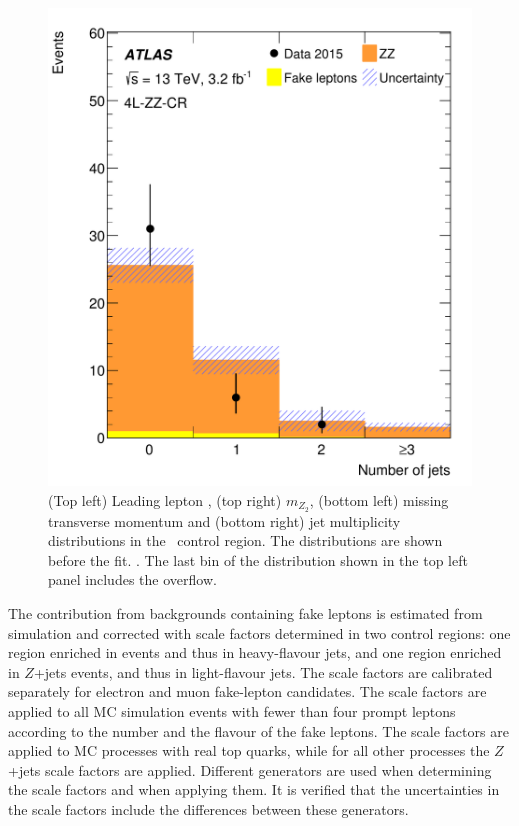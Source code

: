 \begin{figure}[htbp]
\includegraphics[width=\twofigwidth]{CRZZnJets}
\caption{\label{fig:zz_val} (Top left) Leading lepton \pt, (top right)
$m_{Z_2}$, (bottom left) missing transverse momentum and (bottom right) jet
multiplicity distributions in the \FLCR\ control region. The distributions are shown
before the fit. \hatch. The last bin of the distribution shown in the top left
panel includes the overflow.} 
\end{figure}

The contribution from backgrounds containing fake leptons is estimated from
simulation and corrected with scale factors determined in two control regions:
one region enriched in \ttbar events and thus in heavy-flavour jets, and one
region enriched in $Z$+jets events, and thus in light-flavour jets.  The scale factors
are calibrated separately for electron and muon fake-lepton candidates.  The
scale factors are applied to all MC simulation events with fewer than four
prompt leptons according to the number and the flavour of the fake leptons.
The \ttbar scale factors are applied to MC processes with real top quarks,
while for all other processes the $Z$+jets scale factors are applied. Different
generators are used when determining the scale factors and when applying them.
It is verified that the uncertainties in the scale factors include the differences between these generators.

